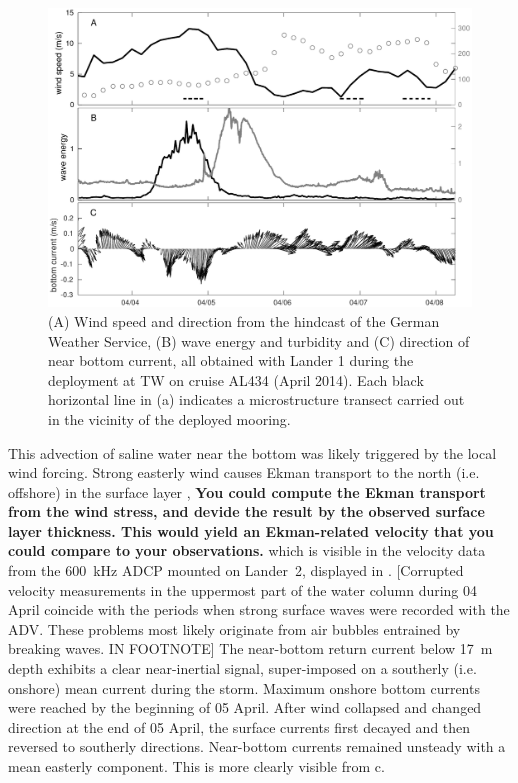  \begin{figure}[ht]
\includegraphics[width=15cm]{bilder/al434tw.pdf}
 \caption{(A) Wind speed and direction from the hindcast of the German Weather 
Service, (B) wave energy and turbidity and (C) direction of 
near bottom current, all obtained with Lander 1 during the deployment at TW on 
cruise AL434 (April 2014). Each black horizontal line in (a) indicates a 
microstructure transect carried out in the vicinity of the deployed mooring.}
 \label{tromperwiek}
 \end{figure}
 
 This advection of saline water near the bottom was likely triggered by the 
local wind 
forcing. Strong easterly wind causes Ekman transport to the north (i.e. 
offshore) in the surface layer \citep[][]{lass2001}, \textbf{You could compute 
the Ekman transport from the wind stress, and devide the result by the observed 
surface layer thickness. This would yield an Ekman-related velocity that you 
could compare to your observations.} which is visible in the 
velocity data from the 600~kHz ADCP mounted on Lander~2, displayed in 
. [Corrupted velocity measurements in the uppermost part of the 
water column during 04 April coincide with the periods when strong surface 
waves were recorded with the ADV. These problems most likely originate from 
air bubbles entrained by breaking waves. IN FOOTNOTE] The near-bottom return 
current below 
17~m depth exhibits a clear near-inertial signal, super-imposed on a southerly 
(i.e. onshore) mean current during the storm. Maximum onshore bottom currents 
were reached by the beginning of 05 April. After wind collapsed and changed 
direction at the end of 05 April, the surface currents 
first decayed and then reversed to southerly directions. Near-bottom 
currents remained unsteady with a mean easterly component. This is more clearly 
visible from c.

